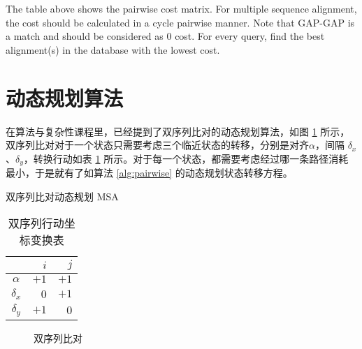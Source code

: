     The table above shows the pairwise cost matrix. For multiple sequence alignment, the cost should be calculated in a cycle pairwise manner. Note that GAP-GAP is a match and should be considered as 0 cost. For every query, find the best alignment(s) in the database with the lowest cost.

    \section{动态规划算法}

    在算法与复杂性课程\cite{algcom}里，已经提到了双序列比对的动态规划算法，如图 \ref{fig:pairwisedp} 所示，双序列比对对于一个状态只需要考虑三个临近状态的转移，分别是对齐$\alpha$，间隔 $\delta_x$、$\delta_y$，转换行动如表 \ref{tab:pairwise} 所示。对于每一个状态，都需要考虑经过哪一条路径消耗最小，于是就有了如算法 \ref{alg:pairwise} 的动态规划状态转移方程。

    \begin{algorithm}[H]
        \caption{双序列比对动态规划 MSA}\label{alg:pairwise}
        \KwOut{}
        \BlankLine
        \;
    \end{algorithm}

    \begin{minipage}{0.48\textwidth}
        \begin{table}[H]
            \centering
            \caption{双序列行动坐标变换表}\label{tab:pairwise}
            \begin{tabular}{crr}
                \toprule
                    & $i$ & $j$ \\
                \midrule
                $\alpha$ & $+1$ & $+1$ \\
                $\delta_x$ & $0$ & $+1$ \\
                $\delta_y$ & $+1$ & $0$ \\
                \bottomrule
            \end{tabular}
        \end{table}
    \end{minipage}\hfil
    \begin{minipage}{0.48\textwidth}
        \begin{figure}[H]
            \centering
            
            \caption{双序列比对}\label{fig:pairwisedp}
        \end{figure}
    \end{minipage}
    \medskip
    
